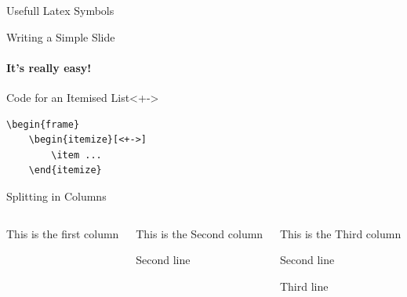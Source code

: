 \documentclass{beamer}
\begin{document}
\begin{frame}{Usefull Latex Symbols}
{\faLock}{\faMap}{\faMapMarker}{\faMapO}{\faMehO}{\faMicrophone}
{\faMicrophoneSlash}{\faSuitcase}{\faTag}{\faTags}{\faTerminal}
{\faToggleOff}{\faToggleOn}{\faTrain}{\faTrash}{\faTrashO}{\faTree}
{\faTrophy}{\faTruck}{\faTwitter}{\faTwitterSquare}{\faUmbrella}
{\faUniversity}{\faUnlock}{\faUnlockAlt}{\faUser}{\faUserMd}{\faUserPlus}
{\faUsers}{\faUserTimes}{\faEnvelope}{\faEnvelopeO}{\faExpeditedssl}
{\faExternalLink}{\faExternalLinkSquare}{\faFastBackward}{\faFastForward}
{\faPaperPlane}{\faPaperPlaneO}{\faVolumeDown}{\faVolumeOff}{\faVolumeUp}
{\faWeibo}{\faWeixin}{\faWifi}{\faWikipediaW}{\faWindows}{\faWordpress}
{\faYoutube}{\faYoutubePlay}{\faYoutubeSquare}{\faBank}{\faBarChartO}
{\faFileZipO}{\faFlash}{\faInstitution}{\faMobilePhone}{\faMortarBoard}
{\faPaste}{\faSend}{\faSendO}{\faWechat}
\end{frame}

\begin{frame}[fragile]{Writing a Simple Slide}
\framesubtitle{It's really easy!}
\begin{block}{Code for an Itemised List}<+->
\begin{verbatim}
\begin{frame}
    \begin{itemize}[<+->]
        \item ...
    \end{itemize}
\end{verbatim}
\end{block}
\end{frame}

\begin{frame}[fragile]{Splitting in Columns}
\begin{columns}
\begin{column}{0.3\textwidth}
	This is the first column\par
\end{column}
\begin{column}{0.4\textwidth}
	This is the Second column\par
	Second line\par
\end{column}
\begin{column}{0.3\textwidth}
	This is the Third column\par
	Second line\par
	Third line\par
\end{column}
\end{columns}
\end{frame}
\end{document}
